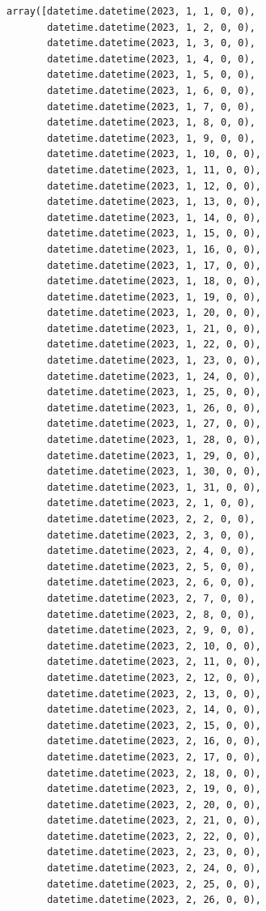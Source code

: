 \documentclass[
  letterpaper,
  DIV=11,
  numbers=noendperiod,
  oneside]{scrreprt}
\begin{document}
\begin{verbatim}
array([datetime.datetime(2023, 1, 1, 0, 0),
       datetime.datetime(2023, 1, 2, 0, 0),
       datetime.datetime(2023, 1, 3, 0, 0),
       datetime.datetime(2023, 1, 4, 0, 0),
       datetime.datetime(2023, 1, 5, 0, 0),
       datetime.datetime(2023, 1, 6, 0, 0),
       datetime.datetime(2023, 1, 7, 0, 0),
       datetime.datetime(2023, 1, 8, 0, 0),
       datetime.datetime(2023, 1, 9, 0, 0),
       datetime.datetime(2023, 1, 10, 0, 0),
       datetime.datetime(2023, 1, 11, 0, 0),
       datetime.datetime(2023, 1, 12, 0, 0),
       datetime.datetime(2023, 1, 13, 0, 0),
       datetime.datetime(2023, 1, 14, 0, 0),
       datetime.datetime(2023, 1, 15, 0, 0),
       datetime.datetime(2023, 1, 16, 0, 0),
       datetime.datetime(2023, 1, 17, 0, 0),
       datetime.datetime(2023, 1, 18, 0, 0),
       datetime.datetime(2023, 1, 19, 0, 0),
       datetime.datetime(2023, 1, 20, 0, 0),
       datetime.datetime(2023, 1, 21, 0, 0),
       datetime.datetime(2023, 1, 22, 0, 0),
       datetime.datetime(2023, 1, 23, 0, 0),
       datetime.datetime(2023, 1, 24, 0, 0),
       datetime.datetime(2023, 1, 25, 0, 0),
       datetime.datetime(2023, 1, 26, 0, 0),
       datetime.datetime(2023, 1, 27, 0, 0),
       datetime.datetime(2023, 1, 28, 0, 0),
       datetime.datetime(2023, 1, 29, 0, 0),
       datetime.datetime(2023, 1, 30, 0, 0),
       datetime.datetime(2023, 1, 31, 0, 0),
       datetime.datetime(2023, 2, 1, 0, 0),
       datetime.datetime(2023, 2, 2, 0, 0),
       datetime.datetime(2023, 2, 3, 0, 0),
       datetime.datetime(2023, 2, 4, 0, 0),
       datetime.datetime(2023, 2, 5, 0, 0),
       datetime.datetime(2023, 2, 6, 0, 0),
       datetime.datetime(2023, 2, 7, 0, 0),
       datetime.datetime(2023, 2, 8, 0, 0),
       datetime.datetime(2023, 2, 9, 0, 0),
       datetime.datetime(2023, 2, 10, 0, 0),
       datetime.datetime(2023, 2, 11, 0, 0),
       datetime.datetime(2023, 2, 12, 0, 0),
       datetime.datetime(2023, 2, 13, 0, 0),
       datetime.datetime(2023, 2, 14, 0, 0),
       datetime.datetime(2023, 2, 15, 0, 0),
       datetime.datetime(2023, 2, 16, 0, 0),
       datetime.datetime(2023, 2, 17, 0, 0),
       datetime.datetime(2023, 2, 18, 0, 0),
       datetime.datetime(2023, 2, 19, 0, 0),
       datetime.datetime(2023, 2, 20, 0, 0),
       datetime.datetime(2023, 2, 21, 0, 0),
       datetime.datetime(2023, 2, 22, 0, 0),
       datetime.datetime(2023, 2, 23, 0, 0),
       datetime.datetime(2023, 2, 24, 0, 0),
       datetime.datetime(2023, 2, 25, 0, 0),
       datetime.datetime(2023, 2, 26, 0, 0),

\end{verbatim}
\end{document}
